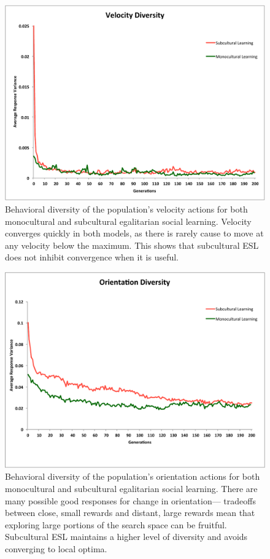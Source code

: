 \documentclass{sig-alternate}
\begin{document}
\begin{figure}
  \centering
    \includegraphics[scale=.41]{velocity_diversity.pdf}
  \caption{Behavioral diversity of the population's velocity actions for both monocultural and subcultural egalitarian social learning.   Velocity converges quickly in both models, as there is rarely cause to move at any velocity below the maximum.  This shows that subcultural ESL does not inhibit convergence when it is useful.}
  \label{fig:velocity}
\end{figure}

\begin{figure}
  \centering
    \includegraphics[scale=.41]{orientation_diversity.pdf}
  \caption{Behavioral diversity of the population's orientation actions for both monocultural and subcultural egalitarian social learning.   There are many possible good responses for change in orientation--- tradeoffs between close, small rewards and distant, large rewards mean that exploring large portions of the search space can be fruitful.  Subcultural ESL maintains a higher level of diversity and avoids converging to local optima.}
\label{fig:orientation}
\end{figure}
\end{document}
